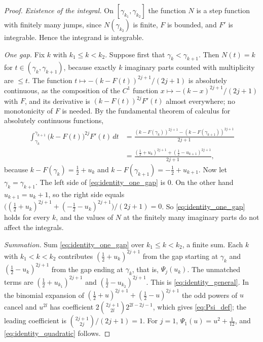 \documentclass[11pt,a4paper]{article}
\makeatletter
\numberwithin{equation}{section}
\DeclareRobustCommand{\CGeqref}[1]{\eqref{#1}}
\let\CG@origeqref\eqref
\newcommand{\CG@gettip}[1]{\@ifundefined{CGTip@#1}{#1}{\csname CGTip@#1\endcsname}}
\DeclareRobustCommand{\CGeqref}[1]{\pdftooltip{\CG@origeqref{#1}}{\CG@gettip{#1}}}
\theoremstyle{definition}
\theoremstyle{remark}
\makeatother
\begin{document}
\begin{proof}
\emph{Existence of the integral.} On $[\gamma_{k_1},\gamma_{k_2}]$ the function $N$ is a step function with finitely many jumps, since $N(\gamma_{k_2})$ is finite, $F$ is bounded, and $F'$ is integrable. Hence the integrand is integrable.

\emph{One gap.} Fix $k$ with $k_1\le k<k_2$. Suppose first that $\gamma_k<\gamma_{k+1}$. Then $N(t)=k$ for $t\in(\gamma_k,\gamma_{k+1})$, because exactly $k$ imaginary parts counted with multiplicity are $\le t$. The function $t\mapsto-(k-F(t))^{2j+1}/(2j+1)$ is absolutely continuous, as the composition of the $C^1$ function $x\mapsto-(k-x)^{2j+1}/(2j+1)$ with $F$, and its derivative is $(k-F(t))^{2j}F'(t)$ almost everywhere; no monotonicity of $F$ is needed. By the fundamental theorem of calculus for absolutely continuous functions,
\begin{equation}
\begin{split}
\int_{\gamma_k}^{\gamma_{k+1}}\bigl(k-F(t)\bigr)^{2j}F'(t)\,dt&=\frac{(k-F(\gamma_k))^{2j+1}-(k-F(\gamma_{k+1}))^{2j+1}}{2j+1}\\
&=\frac{(\frac12+u_k)^{2j+1}+(\frac12-u_{k+1})^{2j+1}}{2j+1},
\end{split}
\label{eq:identity_one_gap}
\end{equation}
because $k-F(\gamma_k)=\frac12+u_k$ and $k-F(\gamma_{k+1})=-\frac12+u_{k+1}$. Now let $\gamma_k=\gamma_{k+1}$. The left side of \CGeqref{eq:identity_one_gap} is $0$. On the other hand $u_{k+1}=u_k+1$, so the right side equals $\bigl((\frac12+u_k)^{2j+1}+(-\frac12-u_k)^{2j+1}\bigr)/(2j+1)=0$. So \CGeqref{eq:identity_one_gap} holds for every $k$, and the values of $N$ at the finitely many imaginary parts do not affect the integrals.

\emph{Summation.} Sum \CGeqref{eq:identity_one_gap} over $k_1\le k<k_2$, a finite sum. Each $k$ with $k_1<k<k_2$ contributes $(\frac12+u_k)^{2j+1}$ from the gap starting at $\gamma_k$ and $(\frac12-u_k)^{2j+1}$ from the gap ending at $\gamma_k$, that is, $\Psi_j(u_k)$. The unmatched terms are $(\frac12+u_{k_1})^{2j+1}$ and $(\frac12-u_{k_2})^{2j+1}$. This is \CGeqref{eq:identity_general}. In the binomial expansion of $(\frac12+u)^{2j+1}+(\frac12-u)^{2j+1}$ the odd powers of $u$ cancel and $u^{2l}$ has coefficient $2\binom{2j+1}{2l}2^{2l-2j-1}$, which gives \CGeqref{eq:Psi_def}; the leading coefficient is $\binom{2j+1}{2j}/(2j+1)=1$. For $j=1$, $\Psi_1(u)=u^2+\frac1{12}$, and \CGeqref{eq:identity_quadratic} follows.
\end{proof}
\end{document}
